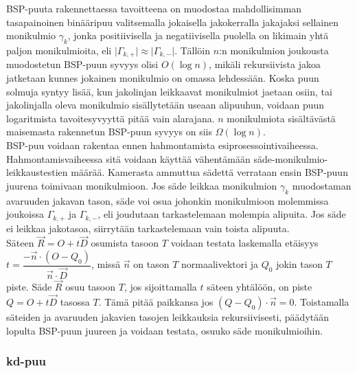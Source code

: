 \documentclass[a4paper, 12pt, titlepage]{article}
\newcommand{\abs}[1]{\vert #1 \vert} %
\begin{document}
BSP-puuta rakennettaessa tavoitteena on muodostaa mahdollisimman tasapainoinen binääripuu valitsemalla jokaisella jakokerralla jakajaksi sellainen monikulmio $\gamma_k$, jonka positiivisella ja negatiivisella puolella on likimain yhtä paljon monikulmioita, eli $\abs{\Gamma_{k,+}} \approx \abs{\Gamma_{k,-}}$. Tällöin  $n$:n monikulmion joukousta muodostetun BSP-puun syvyys olisi $O(\log n)$, mikäli rekursiivista jakoa jatketaan kunnes jokainen monikulmio on omassa lehdessään. Koska puun solmuja syntyy lisää, kun jakolinjan leikkaavat monikulmiot jaetaan osiin, tai jakolinjalla oleva monikulmio sisällytetään useaan alipuuhun, voidaan puun logaritmista tavoitesyvyyttä pitää vain alarajana. \citep[.]{hughes} $n$ monikulmiota sisältävästä maisemasta rakennetun BSP-puun syvyys on siis $\Omega(\log n)$.\\



BSP-puu voidaan rakentaa ennen hahmontamista esiprosessointivaiheessa. Hahmontamisvaiheessa sitä voidaan käyttää vähentämään säde-monikulmio-leikkaustestien määrää. Kamerasta ammuttua sädettä verrataan ensin BSP-puun juurena toimivaan monikulmioon. Jos säde leikkaa monikulmion $\gamma_k$ muodostaman avaruuden jakavan tason, säde voi osua johonkin monikulmioon molemmissa joukoissa ${\Gamma_{k,+}}$ ja ${\Gamma_{k,-}}$, eli joudutaan tarkastelemaan molempia alipuita. Jos säde ei leikkaa jakotasoa, siirrytään tarkastelemaan vain toista alipuuta.\\

Säteen $\vec{R}=O+t\vec{D}$ osumista tasoon $T$ voidaan testata laskemalla etäisyys $t=\dfrac{-\vec{n}\cdot(O-Q_0)}{\vec{n}\cdot\vec{D}}$, missä $\vec{n}$ on tason $T$ normaalivektori ja $Q_0$ jokin tason $T$ piste. Säde $\vec{R}$ osuu tasoon $T$, jos sijoittamalla $t$ säteen yhtälöön, on piste $Q = O+t\vec{D}$ tasossa $T$. Tämä pitää paikkansa jos $(Q-Q_0)\cdot\vec{n} = 0$. \citep[.]{hughes} Toistamalla säteiden ja avaruuden jakavien tasojen leikkauksia rekursiivisesti, päädytään lopulta BSP-puun juureen ja voidaan testata, osuuko säde monikulmioihin. \citep[.]{ranta}\\

\subsubsection{kd-puu}
\end{document}
